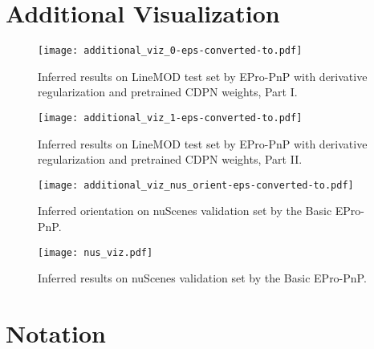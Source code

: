 \documentclass[10pt,twocolumn,letterpaper]{article}
\begin{document}
\vfill\null
\newpage

\section{Additional Visualization}

\begin{figure}[h]
\begin{center}
   \texttt{[image: additional\_viz\_0-eps-converted-to.pdf]}
   \end{center}
   \vspace{-2mm}
   \caption{Inferred results on LineMOD test set by EPro-PnP with derivative regularization and pretrained CDPN weights, Part I.} 
\end{figure}
\vfill\null

\begin{figure}[t]
   \vspace{-2mm}
   \begin{center}
   \texttt{[image: additional\_viz\_1-eps-converted-to.pdf]}
   \end{center}
   \vspace{-2mm}
   \caption{Inferred results on LineMOD test set by EPro-PnP with derivative regularization and pretrained CDPN weights, Part II.} 
\end{figure}

\begin{figure}[t]
   \begin{center}
   \texttt{[image: additional\_viz\_nus\_orient-eps-converted-to.pdf]}
   \end{center}
   \vspace{-3mm}
   \caption{Inferred orientation on nuScenes validation set by the Basic EPro-PnP.} 
\end{figure}

\begin{figure*}[t]
   \captionsetup{font=normalsize}
   \begin{center}
   \texttt{[image: nus\_viz.pdf]}
   \end{center}
   \vspace{-3mm}
   \caption{Inferred results on nuScenes validation set by the Basic EPro-PnP.} 
\end{figure*}

\clearpage
\section{Notation}
\end{document}
